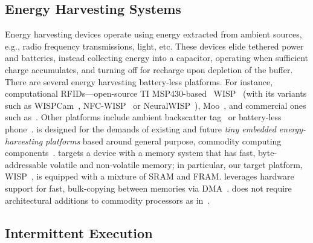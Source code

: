 \subsection{Energy Harvesting Systems}
\label{sec:background_harvesting}

Energy harvesting devices operate using energy extracted from ambient sources, e.g., radio frequency transmissions, light, etc. These devices elide tethered power and batteries, instead collecting energy into a capacitor, operating when sufficient charge accumulates, and turning off for recharge upon depletion of the buffer. There are several energy harvesting battery-less platforms. For instance, computational RFIDs---open-source TI MSP430-based~\cite{wolverine} WISP~\cite{wisp5} (with its variants such as WISPCam~\cite{naderiparizi_rfid_2015}, NFC-WISP~\cite{zhao_rfid_2015} or NeuralWISP~\cite{holleman_biocas_2008}), Moo~\cite{moo}, and commercial ones such as~\cite{medusa_farsens_2017}. Other platforms include ambient backscatter tag~\cite{liu_sigcomm_2013,parks_sigcomm_2014} or battery-less phone~\cite{talla_imwut_2017}. 
%
\sys is designed for the demands of existing and future \emph{tiny embedded energy-harvesting platforms} based around general purpose, commodity computing components~\cite{wisp,msp430datasheet}. \sys targets a device with a memory system that has fast, byte-addressable volatile and non-volatile memory; in particular, our target platform, WISP~\cite{wisp}, is equipped with a mixture of SRAM and FRAM. \sys leverages hardware support for fast, bulk-copying between memories via DMA~\cite{msp430datasheet}. \sys does not require architectural additions to commodity processors as in~\cite{su_date_2017,hicks_isca_2017,quickrecall,nvp}.

\subsection{Intermittent Execution}
\label{sec:background_consistency}

